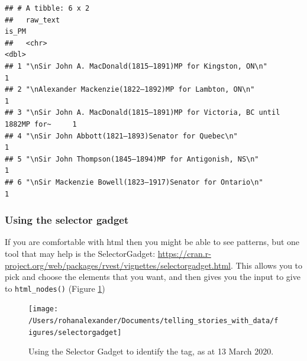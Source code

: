 \documentclass[
]{book}
\newenvironment{Shaded}{\begin{snugshade}}{\end{snugshade}}
\newcommand{\CommentTok}[1]{\textcolor[rgb]{0.56,0.35,0.01}{\textit{#1}}}
\newcommand{\KeywordTok}[1]{\textcolor[rgb]{0.13,0.29,0.53}{\textbf{#1}}}
\newcommand{\NormalTok}[1]{#1}
\newcommand{\OperatorTok}[1]{\textcolor[rgb]{0.81,0.36,0.00}{\textbf{#1}}}
\newcommand{\StringTok}[1]{\textcolor[rgb]{0.31,0.60,0.02}{#1}}
\begin{document}
\begin{verbatim}
## # A tibble: 6 x 2
##   raw_text                                                                 is_PM
##   <chr>                                                                    <dbl>
## 1 "\nSir John A. MacDonald(1815–1891)MP for Kingston, ON\n"                    1
## 2 "\nAlexander Mackenzie(1822–1892)MP for Lambton, ON\n"                       1
## 3 "\nSir John A. MacDonald(1815–1891)MP for Victoria, BC until 1882MP for~     1
## 4 "\nSir John Abbott(1821–1893)Senator for Quebec\n"                           1
## 5 "\nSir John Thompson(1845–1894)MP for Antigonish, NS\n"                      1
## 6 "\nSir Mackenzie Bowell(1823–1917)Senator for Ontario\n"                     1
\end{verbatim}

\hypertarget{using-the-selector-gadget}{%
\subsubsection{Using the selector gadget}\label{using-the-selector-gadget}}

If you are comfortable with html then you might be able to see patterns, but one tool that may help is the SelectorGadget: \url{https://cran.r-project.org/web/packages/rvest/vignettes/selectorgadget.html}. This allows you to pick and choose the elements that you want, and then gives you the input to give to \texttt{html\_nodes()} (Figure \ref{fig:selectorgadget})

\begin{figure}
\texttt{[image: /Users/rohanalexander/Documents/telling\_stories\_with\_data/figures/selectorgadget]} \caption{Using the Selector Gadget to identify the tag, as at 13 March 2020.}\label{fig:selectorgadget}
\end{figure}

\begin{Shaded}
\end{Shaded}
\end{document}
